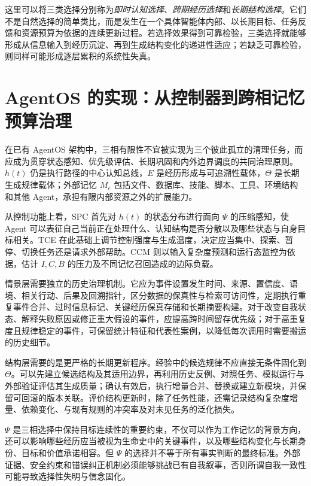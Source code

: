 这里可以将三类选择分别称为\emph{即时认知选择}、\emph{跨期经历选择}和\emph{长期结构选择}。它们不是自然选择的简单类比，而是发生在一个具体智能体内部、以长期目标、任务反馈和资源预算为依据的连续更新过程。若选择效果得到可靠检验，三类选择就能够形成从信息输入到经历沉淀、再到生成结构变化的递进性适应；若缺乏可靠检验，则同样可能形成逐层累积的系统性失真。

\section{AgentOS 的实现：从控制器到跨相记忆预算治理}
\label{sec:agentos-implementation}

在已有 AgentOS 架构中，三相有限性不宜被实现为三个彼此孤立的清理任务，而应成为贯穿状态感知、优先级评估、长期巩固和内外边界调度的共同治理原则。$h(t)$ 仍是执行路径的中心认知总线，$E$ 是经历形成与可追溯性载体，$\Theta$ 是长期生成规律载体；外部记忆 $M_e$ 包括文件、数据库、技能、脚本、工具、环境结构和其他 Agent，承担有限内部资源之外的扩展能力。

从控制功能上看，SPC 首先对 $h(t)$ 的状态分布进行面向 $\Psi$ 的压缩感知，使 Agent 可以表征自己当前正在处理什么、认知结构是否分散以及哪些状态与自身目标相关。TCE 在此基础上调节控制强度与生成温度，决定应当集中、探索、暂停、切换任务还是请求外部帮助。CCM 则以输入复杂度预测和运行态监控为依据，估计 $I,C,B$ 的压力及不同记忆召回造成的边际负载。

情景层需要独立的历史治理机制。它应为事件设置发生时间、来源、置信度、语境、相关行动、后果及回溯指针，区分数据的保真性与检索可访问性，定期执行重复事件合并、过时信息标记、关键经历保真存储和长期摘要构建。对于改变自我状态、解释失败原因或修正重大假设的事件，应提高跨时间留存优先级；对于高重复度且规律稳定的事件，可保留统计特征和代表性案例，以降低每次调用时需要搬运的历史细节。

结构层需要的是更严格的长期更新程序。经验中的候选规律不应直接无条件固化到 $\Theta$。可以先建立候选结构及其适用边界，再利用历史反例、对照任务、模拟运行与外部验证评估其生成质量；确认有效后，执行增量合并、替换或建立新模块，并保留可回滚的版本关联。评价结构更新时，除了任务性能，还需记录结构复杂度增量、依赖变化、与现有规则的冲突率及对未见任务的泛化损失。

$\Psi$ 是三相选择中保持目标连续性的重要约束，不仅可以作为工作记忆的背景方向，还可以影响哪些经历应当被视为生命史中的关键事件，以及哪些结构变化与长期身份、目标和价值承诺相容。但 $\Psi$ 的选择并不等于所有事实判断的最终标准。外部证据、安全约束和错误纠正机制必须能够挑战已有自我叙事，否则所谓自我一致性可能导致选择性失明与信念固化。

